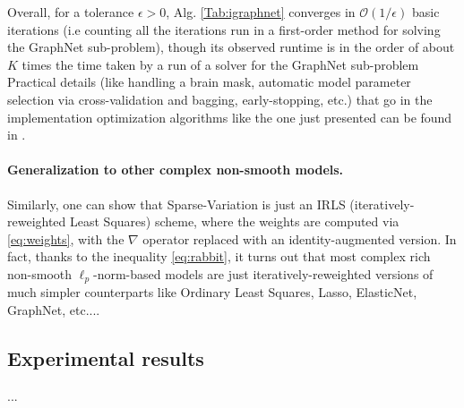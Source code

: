 Overall, for a
tolerance $\epsilon > 0$, Alg. \ref{Tab:igraphnet} converges
in $\mathcal O(1/\epsilon)$ basic
iterations (i.e counting all the iterations run in a first-order
method for solving the GraphNet sub-problem), though its observed
runtime is in the order of about $K$ times the time taken by a run of
a solver for the GraphNet sub-problem
Practical details (like handling a brain mask, automatic model
parameter selection via cross-validation and bagging, early-stopping,
etc.) that go in the implementation optimization algorithms like the
one just presented can be found in
\cite{dohmatob2014benchmarking}.

\paragraph*{Generalization to other complex non-smooth models.}
Similarly, one can show that Sparse-Variation
\citep{eickenberg2015total} is just an IRLS
(iteratively-reweighted Least Squares) scheme, where the weights are
computed via \eqref{eq:weights}, with the $\nabla$ operator replaced
with an identity-augmented version. In fact, thanks to the inequality
\eqref{eq:rabbit}, it turns out that most
complex rich non-smooth $\ell_p$-norm-based models are just
iteratively-reweighted versions of much simpler counterparts like
Ordinary Least Squares, Lasso, ElasticNet, GraphNet, etc....

\subsection{Experimental results}
...




